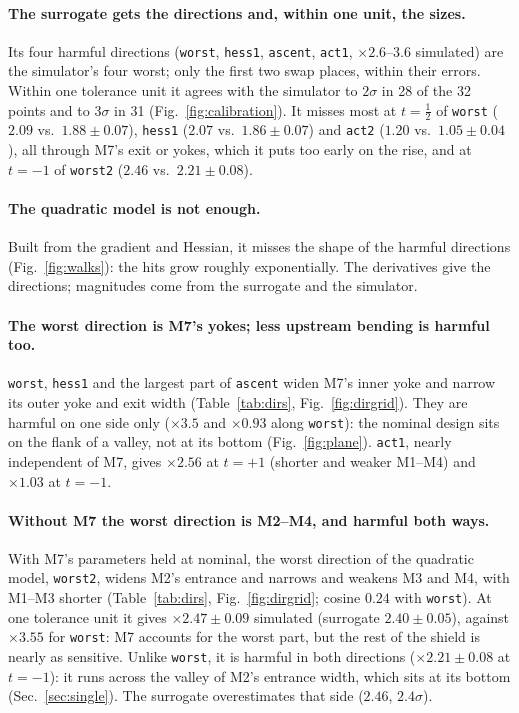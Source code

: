 \documentclass[11pt,a4paper]{article}
\begin{document}
\paragraph{The surrogate gets the directions and, within one unit, the sizes.}
Its four harmful directions (\texttt{worst}, \texttt{hess1}, \texttt{ascent}, \texttt{act1},
$\times2.6$--$3.6$ simulated) are the simulator's four worst; only the first two swap places, within
their errors. Within one tolerance unit it agrees with the simulator to $2\sigma$ in 28 of the 32
points and to $3\sigma$ in 31 (Fig.~\ref{fig:calibration}). It misses most at $t=\tfrac12$ of
\texttt{worst} ($2.09$ vs.\ $1.88\pm0.07$), \texttt{hess1} ($2.07$ vs.\ $1.86\pm0.07$) and
\texttt{act2} ($1.20$ vs.\ $1.05\pm0.04$), all through M7's exit or yokes, which it puts
too early on the rise, and at $t=-1$ of \texttt{worst2} ($2.46$ vs.\ $2.21\pm0.08$).

\paragraph{The quadratic model is not enough.}
Built from the gradient and Hessian, it misses the shape of the harmful directions
(Fig.~\ref{fig:walks}): the hits grow roughly exponentially. The derivatives give the directions;
magnitudes come from the surrogate and the simulator.

\paragraph{The worst direction is M7's yokes; less upstream bending is harmful too.}
\texttt{worst}, \texttt{hess1} and the largest part of \texttt{ascent} widen M7's inner yoke and
narrow its outer yoke and exit width (Table~\ref{tab:dirs}, Fig.~\ref{fig:dirgrid}). They are harmful on one side only
($\times3.5$ and $\times0.93$ along \texttt{worst}): the nominal design sits on the flank of a
valley, not at its bottom (Fig.~\ref{fig:plane}). \texttt{act1}, nearly independent of M7, gives
$\times2.56$ at $t=+1$ (shorter and weaker M1--M4) and $\times1.03$ at $t=-1$.

\paragraph{Without M7 the worst direction is M2--M4, and harmful both ways.}
With M7's parameters held at nominal, the worst direction of the quadratic model,
\texttt{worst2}, widens M2's entrance and narrows and weakens M3 and M4, with M1--M3 shorter
(Table~\ref{tab:dirs}, Fig.~\ref{fig:dirgrid}; cosine $0.24$ with \texttt{worst}). At one
tolerance unit it gives $\times2.47\pm0.09$ simulated (surrogate $2.40\pm0.05$), against
$\times3.55$ for \texttt{worst}: M7 accounts for the worst part, but the rest of the shield is
nearly as sensitive. Unlike \texttt{worst}, it is harmful in both directions ($\times2.21\pm0.08$
at $t=-1$): it runs across the valley of M2's entrance width, which sits at its bottom
(Sec.~\ref{sec:single}). The surrogate overestimates that side ($2.46$, $2.4\sigma$).
\end{document}

